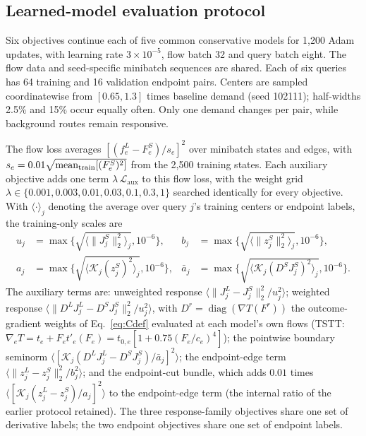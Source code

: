\subsection{Learned-model evaluation protocol}\label{app:pairs-v102}
Six objectives continue each of five common conservative models for
1,200 Adam updates, with learning rate $3\times10^{-5}$, flow batch 32
and query batch eight. The flow data and seed-specific minibatch
sequences are shared. Each of six queries has 64 training and 16
validation endpoint pairs. Centers are sampled coordinatewise from
$[0.65,1.3]$ times baseline demand (seed 102111); half-widths 2.5\% and
15\% occur equally often. Only one demand changes per pair, while
background routes remain responsive.

The flow loss averages $[(f_e^L-F_e^S)/s_e]^2$ over minibatch states
and edges, with $s_e=0.01\sqrt{\operatorname{mean}_{\rm train}[(F_e^S)^2]}$ from the
2,500 training states. Each auxiliary objective adds one term
$\lambda\,\mathcal L_{\mathrm{aux}}$ to this flow loss, with the weight
grid $\lambda\in\{0.001,0.003,0.01,0.03,0.1,0.3,1\}$ searched
identically for every objective. With
$\langle\cdot\rangle_j$ denoting the average over query $j$'s training
centers or endpoint labels, the training-only scales are
\[
\begin{aligned}
u_j&=\max\{\sqrt{\langle\|J_j^S\|_2^2\rangle_j},10^{-6}\},&
b_j&=\max\{\sqrt{\langle\|z_j^S\|_2^2\rangle_j},10^{-6}\},\\
a_j&=\max\{\sqrt{\langle\mathcal K_j(z_j^S)^2\rangle_j},10^{-6}\},&
\bar a_j&=\max\{\sqrt{\langle\mathcal K_j(D^SJ_j^S)^2\rangle_j},10^{-6}\}.
\end{aligned}
\]
The auxiliary terms are: unweighted response
$\langle\|J_j^L-J_j^S\|_2^2/u_j^2\rangle$; weighted response
$\langle\|D^LJ_j^L-D^SJ_j^S\|_2^2/u_j^2\rangle$, with
$D^r=\operatorname{diag}(\nabla T(F^r))$ the outcome-gradient weights
of Eq.~\eqref{eq:Cdef} evaluated at each model's own flows (TSTT:
$\nabla_eT=t_e+F_et'_e(F_e)=t_{0,e}[1+0.75(F_e/c_e)^4]$);
the pointwise boundary seminorm
$\langle[\mathcal K_j(D^LJ_j^L-D^SJ_j^S)/\bar a_j]^2\rangle$; the
endpoint-edge term
$\langle\|z_j^L-z_j^S\|_2^2/b_j^2\rangle$; and the endpoint-cut bundle,
which adds $0.01$ times
$\langle[\mathcal K_j(z_j^L-z_j^S)/a_j]^2\rangle$ to the endpoint-edge
term (the internal ratio of the earlier protocol retained). The three
response-family objectives share one set of derivative labels; the two
endpoint objectives share one set of endpoint labels.

